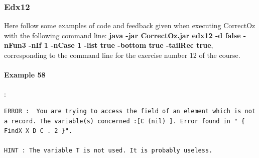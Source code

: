 \documentclass[11pt,a4paper,twoside,openright]{report}
\begin{document}
\subsubsection{Edx12}
Here follow some examples of code and feedback given when executing 
CorrectOz with the following command line: \textbf{java -jar CorrectOz.jar edx12 -d 
false -nFun3 -nIf 1 -nCase 1 -list true -bottom true -tailRec true}, 
corresponding to the command line for the exercise number 12 of the course.


\paragraph{Example 58}:

\newpage
\begin{lstlisting}
ERROR :  You are trying to access the field of an element which is not a record. The variable(s) concerned :[C (nil) ]. Error found in " { FindX X D C . 2 }".

HINT : The variable T is not used. It is probably useless.
\end{lstlisting}

%
%
%
%
%
%
\end{document}
